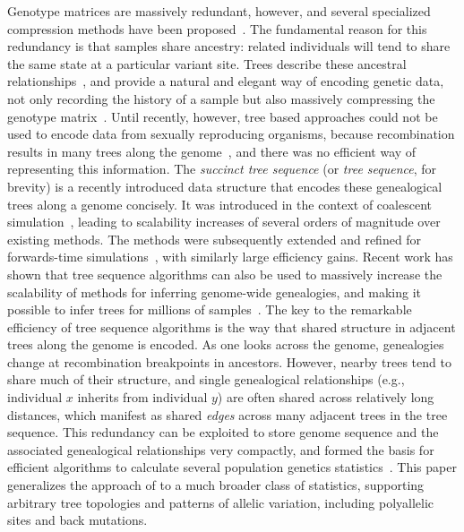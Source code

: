 \documentclass[9pt,twoside,lineno]{gsajnl}
\begin{document}
Genotype matrices are massively redundant, however, and several specialized
compression methods have been proposed~\citep{
christley2008human,qiao2012handling,durbin2014efficient,sambo2014compression,layer2016efficient,
danek2018gtc,lin2019sparse}.
The fundamental reason for this redundancy is that samples share ancestry:
related individuals will tend to share the same state at a particular variant site.
Trees describe these ancestral
relationships~\citep{felsenstein2004inferring,semple2003phylogenetics},
and provide a natural and elegant way of encoding genetic data,
not only recording the history of a sample but also massively compressing
the genotype matrix~\citep{ane2005missing}. Until recently, however,
tree based approaches could not be used to encode data from sexually reproducing organisms, because
recombination results in many trees along the
genome~\citep{hudson1983properties,griffiths1991two,griffiths1996ancestral,rasmussen2014genome},
and there was no efficient way of representing this information.
The \emph{succinct tree sequence} (or \emph{tree sequence}, for brevity)
is a recently introduced data structure that
encodes these genealogical trees along a genome concisely.
It was introduced in the context of coalescent
simulation~\citep{kelleher2016efficient}, leading to scalability increases of
several orders of magnitude over existing methods. The methods were subsequently extended
and refined for forwards-time
simulations~\citep{kelleher2018efficient,haller2018tree}, with similarly large efficiency gains.
Recent work has shown that tree sequence algorithms can
also be used to massively increase the scalability of methods for inferring
genome-wide genealogies, and making it possible to infer trees for millions of
samples~\citep{kelleher2019inferring}.
The key to the remarkable efficiency of tree sequence
algorithms is the way that shared structure in adjacent trees along the genome is encoded.
As one looks across the genome, genealogies change at recombination breakpoints in ancestors.
However, nearby trees tend to share much of their structure,
and single genealogical relationships (e.g., individual $x$ inherits from individual $y$)
are often shared across relatively long distances,
which manifest as shared \emph{edges} across many adjacent trees in the tree sequence.
This redundancy can be exploited to store genome sequence and the
associated genealogical relationships very compactly, and formed the basis for
efficient algorithms to calculate several population genetics
statistics~\citep{kelleher2016efficient}.
This paper generalizes the approach of \citet{kelleher2016efficient} to a much broader class of statistics,
supporting arbitrary tree topologies and patterns of allelic variation,
including polyallelic sites and back mutations.
\end{document}
